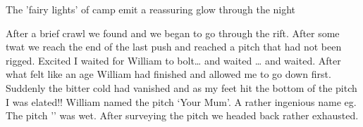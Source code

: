 \begin{marginfigure}
\centering
  \caption{The 'fairy lights' of camp \protect{} emit a reassuring glow through the night}
\end{marginfigure}

After a brief crawl we found   and we began to go through the rift. After some twat we reach the end of the last push and reached a pitch that had not been rigged. Excited I waited for William to bolt… and waited … and waited. After what felt like an age William had finished and allowed me to go down first. Suddenly the bitter cold had vanished and as my feet hit the bottom of the pitch I was elated!! William named the pitch ‘Your Mum’. A rather ingenious name eg. The pitch '' was wet. After surveying the pitch we headed back rather exhausted. 



